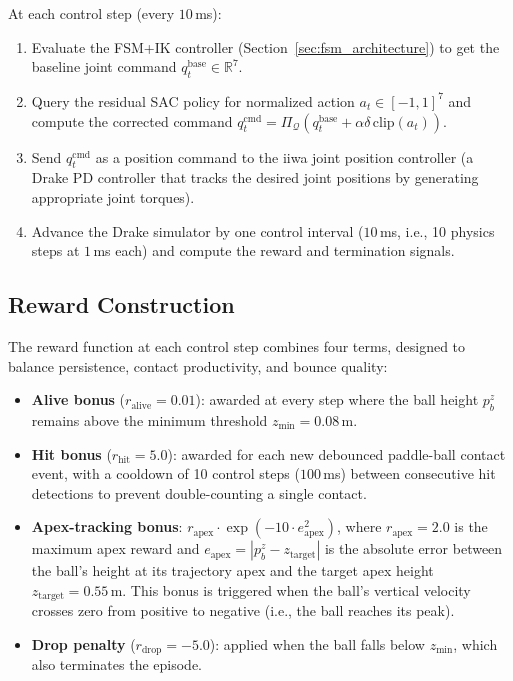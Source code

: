 \documentclass[10pt,twocolumn,letterpaper]{article}
\begin{document}
At each control step (every $10$\,ms):
\begin{enumerate}[leftmargin=*,noitemsep]
    \item Evaluate the FSM+IK controller (Section~\ref{sec:fsm_architecture}) to get the baseline joint command $q_t^{\mathrm{base}} \in \mathbb{R}^7$.
    \item Query the residual SAC policy for normalized action $a_t \in [-1,1]^7$ and compute the corrected command $q_t^{\mathrm{cmd}} = \Pi_{\mathcal{Q}}(q_t^{\mathrm{base}} + \alpha\delta\,\mathrm{clip}(a_t))$.
    \item Send $q_t^{\mathrm{cmd}}$ as a position command to the iiwa joint position controller (a Drake PD controller that tracks the desired joint positions by generating appropriate joint torques).
    \item Advance the Drake simulator by one control interval ($10$\,ms, i.e., 10 physics steps at $1$\,ms each) and compute the reward and termination signals.
\end{enumerate}

\subsection{Reward Construction}
\label{sec:reward}
The reward function at each control step combines four terms, designed to balance persistence, contact productivity, and bounce quality:
\begin{itemize}[leftmargin=*,noitemsep]
    \item \textbf{Alive bonus} ($r_{\text{alive}} = 0.01$): awarded at every step where the ball height $p_b^z$ remains above the minimum threshold $z_{\min} = 0.08$\,m.
    \item \textbf{Hit bonus} ($r_{\text{hit}} = 5.0$): awarded for each new debounced paddle-ball contact event, with a cooldown of 10 control steps ($100$\,ms) between consecutive hit detections to prevent double-counting a single contact.
    \item \textbf{Apex-tracking bonus}: $r_{\mathrm{apex}} \cdot \exp(-10 \cdot e_{\mathrm{apex}}^2)$, where $r_{\mathrm{apex}} = 2.0$ is the maximum apex reward and $e_{\mathrm{apex}} = |p_b^z - z_{\mathrm{target}}|$ is the absolute error between the ball's height at its trajectory apex and the target apex height $z_{\mathrm{target}} = 0.55$\,m. This bonus is triggered when the ball's vertical velocity crosses zero from positive to negative (i.e., the ball reaches its peak).
    \item \textbf{Drop penalty} ($r_{\text{drop}} = -5.0$): applied when the ball falls below $z_{\min}$, which also terminates the episode.
\end{itemize}
\end{document}
